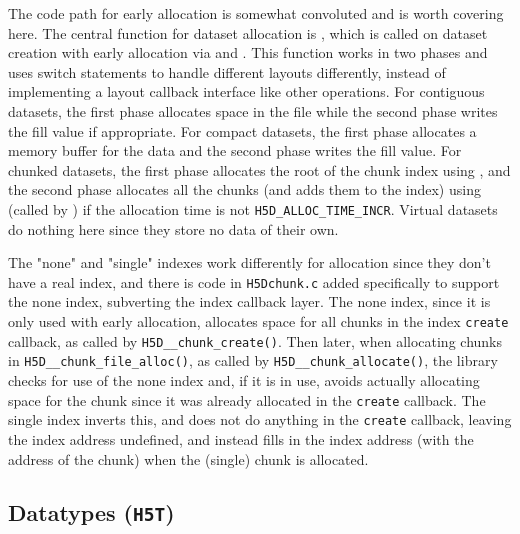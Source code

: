 \begin{itemize}
The code path for early allocation is somewhat convoluted and is worth covering here. The central function for dataset allocation is , which is called on dataset creation with early allocation via  and . This function works in two phases and uses switch statements to handle different layouts differently, instead of implementing a layout callback interface like other operations. For contiguous datasets, the first phase allocates space in the file while the second phase writes the fill value if appropriate. For compact datasets, the first phase allocates a memory buffer for the data and the second phase writes the fill value. For chunked datasets, the first phase allocates the root of the chunk index using , and the second phase allocates all the chunks (and adds them to the index) using  (called by ) if the allocation time is not \texttt{H5D\_ALLOC\_TIME\_INCR}. Virtual datasets do nothing here since they store no data of their own.

The "none" and "single" indexes work differently for allocation since they don't have a real index, and there is code in \texttt{H5Dchunk.c} added specifically to support the none index, subverting the index callback layer. The none index, since it is only used with early allocation, allocates space for all chunks in the index \texttt{create} callback, as called by \texttt{H5D\_\_chunk\_create()}. Then later, when allocating chunks in \texttt{H5D\_\_chunk\_file\_alloc()}, as called by \texttt{H5D\_\_chunk\_allocate()}, the library checks for use of the none index and, if it is in use, avoids actually allocating space for the chunk since it was already allocated in the \texttt{create} callback. The single index inverts this, and does not do anything in the \texttt{create} callback, leaving the index address undefined, and instead fills in the index address (with the address of the chunk) when the (single) chunk is allocated.

\end{itemize}


\subsection{Datatypes (\texttt{H5T})}

